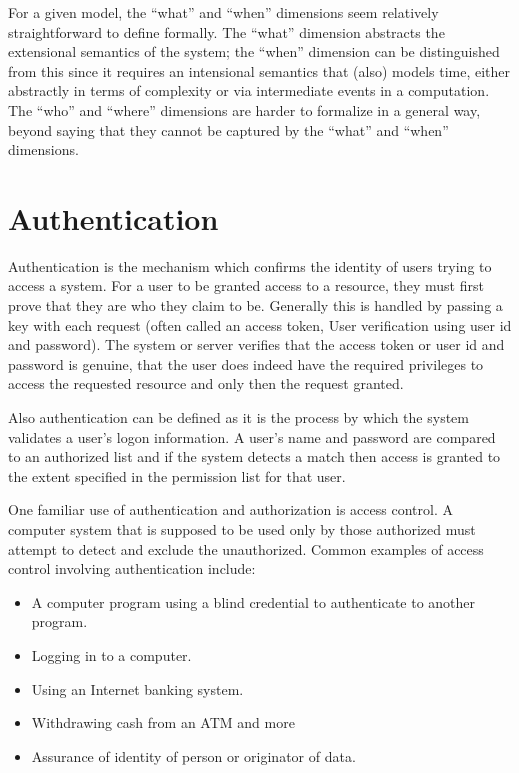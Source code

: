For a given model, the \enquote{what} and \enquote{when} dimensions seem relatively straightforward to define formally. The \enquote{what} dimension abstracts the extensional semantics
of the system; the \enquote{when} dimension can be distinguished from this since it requires an intensional semantics that (also) models time, either abstractly in terms of complexity
or via intermediate events in a computation. The \enquote{who} and \enquote{where} dimensions are
harder to formalize in a general way, beyond saying that they cannot be captured by the
\enquote{what} and \enquote{when} dimensions.

\section{Authentication}
Authentication is the mechanism which confirms the identity of users trying to access a system. For a user to be granted access to a resource, they must first prove that they are who they claim to be. Generally this is handled by passing a key with each request (often called an access token, User verification using user id and password). The system or server verifies that the access token or user id and password is genuine, that the user does indeed have the required privileges to access the requested resource and only then the request granted.

Also authentication can be defined as it is the process by which the system validates a user's logon information. A user's name and password are compared to an authorized list and if the system detects a match then access is granted to the extent specified in the permission list for that user.

One familiar use of authentication and authorization is access control. A computer system that is supposed to be used only by those authorized must attempt to detect and exclude the unauthorized. Common examples of access control involving authentication include:
\begin{itemize}	
	\item A computer program using a blind credential to authenticate to another program.
	\item Logging in to a computer.	
	\item Using an Internet banking system.
	\item Withdrawing cash from an ATM and more
	\item Assurance of identity of person or originator of data.
\end{itemize}

